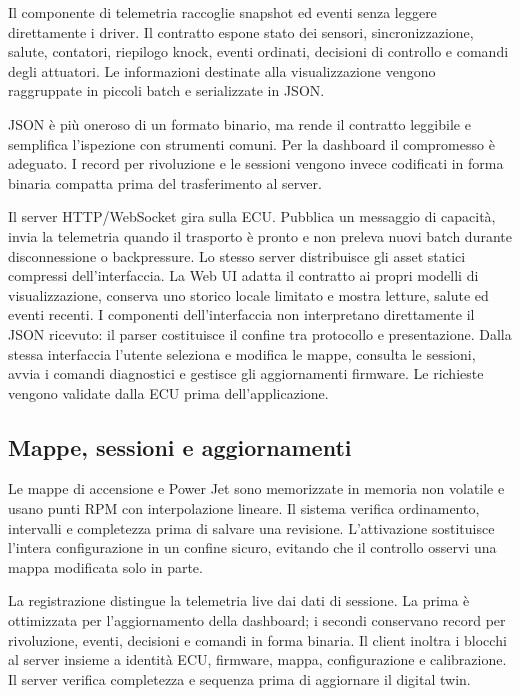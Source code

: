 \documentclass{article}
\begin{document}
Il componente di telemetria raccoglie snapshot ed eventi senza leggere
direttamente i driver. Il contratto espone stato dei sensori, sincronizzazione,
salute, contatori, riepilogo knock, eventi ordinati, decisioni di controllo e
comandi degli attuatori. Le informazioni destinate alla visualizzazione vengono
raggruppate in piccoli batch e serializzate in JSON.

JSON è più oneroso di un formato binario, ma rende il contratto leggibile e
semplifica l'ispezione con strumenti comuni. Per la dashboard il compromesso è
adeguato. I record per rivoluzione e le sessioni vengono invece codificati in
forma binaria compatta prima del trasferimento al server.

Il server HTTP/WebSocket gira sulla ECU. Pubblica un messaggio di capacità,
invia la telemetria quando il trasporto è pronto e non preleva nuovi batch
durante disconnessione o backpressure. Lo stesso server distribuisce gli asset
statici compressi dell'interfaccia. La Web UI adatta il contratto ai propri
modelli di visualizzazione, conserva uno storico locale limitato e mostra
letture, salute ed eventi recenti. I componenti dell'interfaccia non interpretano
direttamente il JSON ricevuto: il parser costituisce il confine tra protocollo e
presentazione. Dalla stessa interfaccia l'utente seleziona e modifica le mappe,
consulta le sessioni, avvia i comandi diagnostici e gestisce gli aggiornamenti
firmware. Le richieste vengono validate dalla ECU prima dell'applicazione.

\subsection{Mappe, sessioni e aggiornamenti}

Le mappe di accensione e Power Jet sono memorizzate in memoria non volatile e
usano punti RPM con interpolazione lineare. Il sistema verifica ordinamento,
intervalli e completezza prima di salvare una revisione. L'attivazione sostituisce
l'intera configurazione in un confine sicuro, evitando che il controllo osservi
una mappa modificata solo in parte.

La registrazione distingue la telemetria live dai dati di sessione. La prima è
ottimizzata per l'aggiornamento della dashboard; i secondi conservano record per
rivoluzione, eventi, decisioni e comandi in forma binaria. Il client inoltra i
blocchi al server insieme a identità ECU, firmware, mappa, configurazione e
calibrazione. Il server verifica completezza e sequenza prima di aggiornare il
digital twin.
\end{document}
